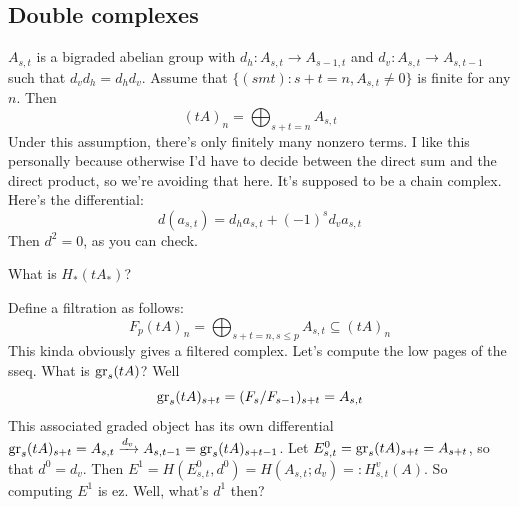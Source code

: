\subsection{Double complexes}
$A_{s,t}$ is a bigraded abelian group with $d_h:A_{s,t}\to A_{s-1,t}$ and $d_v:A_{s,t}\to A_{s,t-1}$ such that $d_vd_h = d_hd_v$.
Assume that $\{(smt):s+t=n,A_{s,t}\neq 0\}$ is finite for any $n$.
Then
$$
(tA)_n = \bigoplus_{s+t=n}A_{s,t}
$$
Under this assumption, there's only finitely many nonzero terms.
I like this personally because otherwise I'd have to decide between the direct sum and the direct product, so we're avoiding that here.
It's supposed to be a chain complex.
Here's the differential:
$$
d(a_{s,t}) = d_ha_{s,t} + (-1)^s d_v a_{s,t}
$$
Then $d^2 = 0$, as you can check.
\begin{question}
    What is $H_\ast(tA_\ast)$?
\end{question}
Define a filtration as follows:
$$
F_p(tA)_n = \bigoplus_{s+t=n,s\leq p}A_{s,t}\subseteq (tA)_n
$$
This kinda obviously gives a filtered complex.
Let's compute the low pages of the sseq.
What is $\mathrm{gr}_s(tA)$?
Well
$$
\mathrm{gr}_s(tA)_{s+t} = (F_s/F_{s-1})_{s+t} = A_{s,t}
$$
This associated graded object has its own differential $\mathrm{gr}_s(tA)_{s+t}=A_{s,t}\xrightarrow{{d_v}} A_{s,t-1} = \mathrm{gr}_s(tA)_{s+t-1}$.
Let $E^0_{s,t} = \mathrm{gr}_s(tA)_{s+t} = A_{s+t}$, so that $d^0 = d_v$.
Then $E^1 = H(E^0_{s,t},d^0) = H(A_{s,t};d_v) =: H^v_{s,t}(A)$.
So computing $E^1$ is ez.
Well, what's $d^1$ then?

